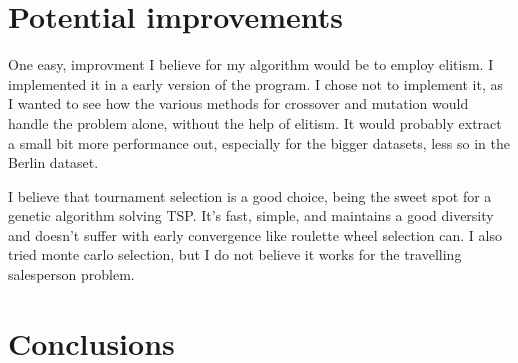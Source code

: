 \documentclass[11pt]{scrartcl} %
\begin{document}
\section{Potential improvements}
\label{Potential improvements}
One easy, improvment I believe for my algorithm would be to employ elitism.
I implemented it in a early version of the program. I chose not to implement it, as I wanted to see how the various methods for crossover and mutation would handle the problem alone, without the help of elitism.
It would probably extract a small bit more performance out, especially for the bigger datasets, less so in the Berlin dataset.

I believe that tournament selection is a good choice, being the sweet spot for a genetic algorithm solving TSP. It's fast, simple, and maintains a good diversity and doesn't suffer with early convergence like roulette wheel selection can\cite{genetic_algorithm_afternoon}.
I also tried monte carlo selection, but I do not believe it works for the travelling salesperson problem.

\section{Conclusions}

\printbibliography
\end{document}
